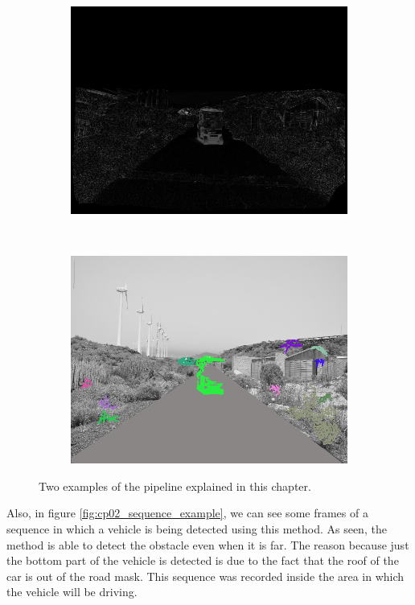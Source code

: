 \begin{figure}[h!]
\begin{subfigure}[b]{0.24\columnwidth}
	    \includegraphics[width=\textwidth]{pipeline2/fig4}\label{fig:pipelineB_3}
        \end{subfigure}%
        ~
        \begin{subfigure}[b]{0.24\columnwidth}
	    \includegraphics[width=\textwidth]{pipeline2/fig5}\label{fig:pipelineB_4}
        \end{subfigure}%
        \caption{Two examples of the pipeline explained in this chapter.}\label{fig:cp02_pipeline_example}
\end{figure}

Also, in figure \ref{fig:cp02_sequence_example}, we can see some frames of a sequence in which a vehicle is being detected using this method. As seen, the method is able to detect the obstacle even when it is far. The reason because just the bottom part of the vehicle is detected is due to the fact that the roof of the car is out of the road mask. This sequence was recorded inside the area in which the vehicle will be driving.

